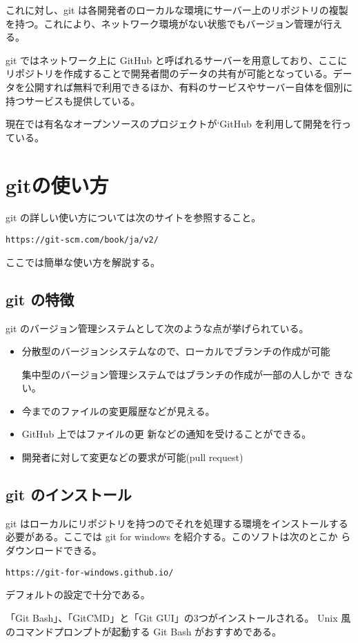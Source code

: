 これに対し、git は各開発者のローカルな環境にサーバー上のリポジトリの複製
を持つ。これにより、ネットワーク環境がない状態でもバージョン管理が行える。

git ではネットワーク上に GitHub と呼ばれるサーバーを用意しており、ここに
リポジトリを作成することで開発者間のデータの共有が可能となっている。デー
タを公開すれば無料で利用できるほか、有料のサービスやサーバー自体を個別に
持つサービスも提供している。

現在では有名なオープンソースのプロジェクトが`GitHub を利用して開発を行っ
ている。
\section{gitの使い方}
git の詳しい使い方については次のサイトを参照すること。

\Verb+https://git-scm.com/book/ja/v2/+

ここでは簡単な使い方を解説する。

\subsection{git の特徴}
git のバージョン管理システムとして次のような点が挙げられている。
\begin{itemize}
 \item 分散型のバージョンシステムなので、ローカルでブランチの作成が可能

       集中型のバージョン管理システムではブランチの作成が一部の人しかで
       きない。
 \item 今までのファイルの変更履歴などが見える。
 \item  GitHub 上ではファイルの更
       新などの通知を受けることができる。
 \item 開発者に対して変更などの要求が可能(pull request)
\end{itemize}

\subsection{git のインストール}
git はローカルにリポジトリを持つのでそれを処理する環境をインストールする
必要がある。ここでは git for windows を紹介する。このソフトは次のとこか
らダウンロードできる。

\Verb+https://git-for-windows.github.io/+

デフォルトの設定で十分である。

「Git Bash」、「GitCMD」と「Git GUI」の3つがインストールされる。
Unix 風のコマンドプロンプトが起動する Git Bash がおすすめである。

